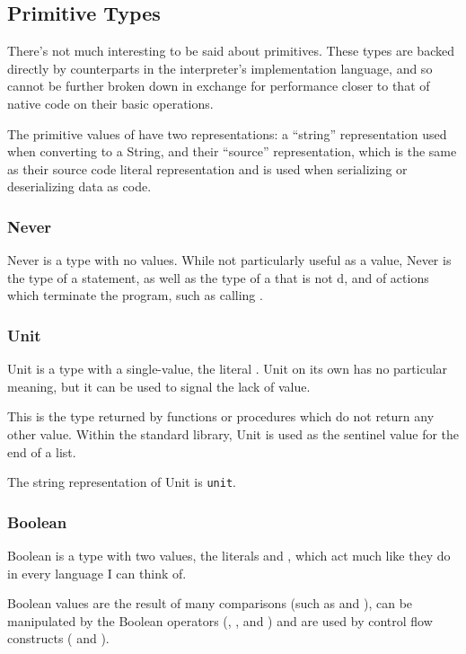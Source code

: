 \subsection{Primitive Types}

There's not much interesting to be said about primitives. These types are
backed directly by counterparts in the interpreter's implementation language,
and so cannot be further broken down in exchange for performance closer to
that of native code on their basic operations.

The primitive values of \Trilogy{} have two representations: a ``string''
representation used when converting to a String, and their ``source''
representation, which is the same as their source code literal representation
and is used when serializing or deserializing data as code.

\subsubsection{Never}

Never is a type with no values. While not particularly useful as a value,
Never is the type of a  statement, as well as the type of
a  that is not d, and of actions which terminate the
program, such as calling .

\subsubsection{Unit}

Unit is a type with a single-value, the literal . Unit on its own
has no particular meaning, but it can be used to signal the lack of value.

This is the type returned by functions or procedures which do not return
any other value. Within the standard library, Unit is used as the sentinel
value for the end of a list.

The string representation of Unit is \texttt{unit}.

\subsubsection{Boolean}

Boolean is a type with two values, the literals  and ,
which act much like they do in every language I can think of.

Boolean values are the result of many comparisons (such as  and
), can be manipulated by the Boolean operators (, ,
and ) and are used by control flow constructs ( and
).

